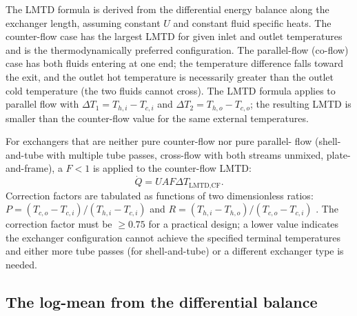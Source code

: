 The LMTD formula is derived from the differential energy balance
along the exchanger length, assuming constant $U$ and constant fluid
specific heats. The counter-flow case has the largest LMTD for given
inlet and outlet temperatures and is the thermodynamically preferred
configuration. The parallel-flow (co-flow) case has both fluids
entering at one end; the temperature difference falls toward the
exit, and the outlet hot temperature is necessarily greater than the
outlet cold temperature (the two fluids cannot cross). The LMTD
formula applies to parallel flow with $\Delta T_1 = T_{h,i} -
T_{c,i}$ and $\Delta T_2 = T_{h,o} - T_{c,o}$; the resulting LMTD is
smaller than the counter-flow value for the same external
temperatures.



For exchangers that are neither pure counter-flow nor pure parallel-
flow (shell-and-tube with multiple tube passes, cross-flow with both
streams unmixed, plate-and-frame), a  $F
< 1$ is applied to the counter-flow LMTD:
\[
\dot{Q} = U A F \Delta T_{\text{LMTD,CF}}.
\]
Correction factors are tabulated as functions of two dimensionless
ratios: $P = (T_{c,o} - T_{c,i})/(T_{h,i} - T_{c,i})$ and $R =
(T_{h,i} - T_{h,o})/(T_{c,o} - T_{c,i})$ \cite{text:incropera2007}.
The correction factor must be $\geq 0.75$ for a practical design; a
lower value indicates the exchanger configuration cannot achieve the
specified terminal temperatures and either more tube passes (for
shell-and-tube) or a different exchanger type is needed.



\subsection{The log-mean from the differential balance}

